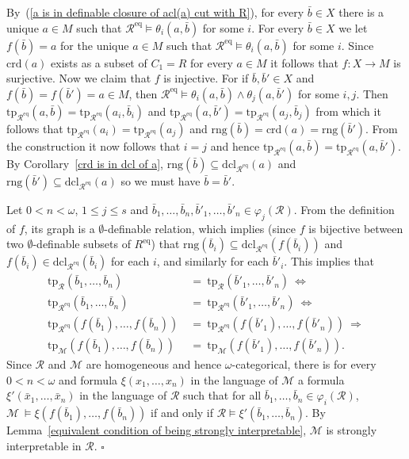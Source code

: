 \documentclass[11pt, twoside]{amsart}
\numberwithin{equation}{section}
\newcommand{\tp}{\mathrm{tp}}
\newcommand{\dcl}{\mathrm{dcl}}
\newcommand{\es}{\emptyset}
\newcommand{\crd}{\mathrm{crd}}
\newcommand{\meq}{^{\mathrm{eq}}}
\newcommand{\mcM}{\mathcal{M}}
\newcommand{\mcR}{\mathcal{R}}
\newcommand{\rng}{\mathrm{rng}}
\begin{document}
By~(\ref{a is in definable closure of acl(a) cut with R}),
for every $\bar{b} \in X$ there is a unique $a \in M$ such that 
$\mcR\meq \models \theta_i(a, \bar{b})$ for some $i$. 
For every $\bar{b} \in X$ we let $f(\bar{b}) = a$ for the unique $a \in M$ such that $\mcR\meq \models \theta_i(a, \bar{b})$ for some $i$.
Since $\crd(a)$ exists as a subset of $C_1 = R$ for every $a \in M$ it follows that $f : X \to M$ is surjective.
Now we claim that $f$ is injective. 
For if $\bar{b}, \bar{b}' \in X$ and $f(\bar{b}) = f(\bar{b}') = a \in M$,
then $\mcR\meq \models \theta_i(a, \bar{b}) \wedge \theta_j(a, \bar{b}')$ for some $i, j$.
Then $\tp_{\mcR\meq}(a, \bar{b}) = \tp_{\mcR\meq}(a_i, \bar{b}_i)$ and
$\tp_{\mcR\meq}(a, \bar{b}') = \tp_{\mcR\meq}(a_j, \bar{b}_j)$ from which it follows
that $\tp_{\mcR\meq}(a_i) = \tp_{\mcR\meq}(a_j)$ and $\rng(\bar{b}) = \crd(a)  = \rng(\bar{b}')$. 
From the construction it now follows that $i = j$ and hence
$\tp_{\mcR\meq}(a, \bar{b}) = \tp_{\mcR\meq}(a, \bar{b}')$.
By Corollary~\ref{crd is in dcl of a}, $\rng(\bar{b}) \subseteq \dcl_{\mcR\meq}(a)$ and $\rng(\bar{b}') \subseteq \dcl_{\mcR\meq}(a)$
so we must have $\bar{b} = \bar{b}'$.

Let $0 < n < \omega$, $1 \leq j \leq s$ and $\bar{b}_1, \ldots, \bar{b}_n, \bar{b}'_1, \ldots, \bar{b}'_n \in \varphi_j(\mcR)$.
From the definition of $f$, its graph is a $\es$-definable relation, which implies 
(since $f$ is bijective between two $\es$-definable subsets of $R\meq$)
that 
$\rng(\bar{b}_i) \subseteq \dcl_{\mcR\meq}(f(\bar{b}_i))$ and $f(\bar{b}_i) \in \dcl_{\mcR\meq}(\bar{b}_i)$ for each $i$, and similarly for
each $\bar{b}'_i$. This implies that
\begin{align*}
\tp_\mcR(\bar{b}_1, \ldots, \bar{b}_n) \ &= \ \tp_\mcR(\bar{b}'_1, \ldots, \bar{b}'_n) \ \Longleftrightarrow \\
\tp_{\mcR\meq}(\bar{b}_1, \ldots, \bar{b}_n) \ &= \ \tp_{\mcR\meq}(\bar{b}'_1, \ldots, \bar{b}'_n) \ \Longleftrightarrow \\
\tp_{\mcR\meq}(f(\bar{b}_1), \ldots, f(\bar{b}_n)) \ &= \ \tp_{\mcR\meq}(f(\bar{b}'_1), \ldots, f(\bar{b}'_n)) \ \Longrightarrow \\
\tp_\mcM(f(\bar{b}_1), \ldots, f(\bar{b}_n)) \ &= \ \tp_\mcM(f(\bar{b}'_1), \ldots, f(\bar{b}'_n)).
\end{align*}
Since $\mcR$ and $\mcM$ are homogeneous and hence $\omega$-categorical,
there is 
for every $0 < n < \omega$ and formula $\xi(x_1, \ldots, x_n)$ in the language of $\mcM$
a formula $\xi'(\bar{x}_1, \ldots, \bar{x}_n)$ in the language of $\mcR$ such that for
all $\bar{b}_1, \ldots, \bar{b}_n \in \varphi_i(\mcR)$,
$\mcM \ \models \xi(f(\bar{b}_1), \ldots, f(\bar{b}_n))$ if and only if
$\mcR \models \xi'(\bar{b}_1, \ldots, \bar{b}_n)$.
By Lemma~\ref{equivalent condition of being strongly interpretable}, 
$\mcM$ is strongly interpretable in $\mcR$.
\hfill $\square$
\end{document}
